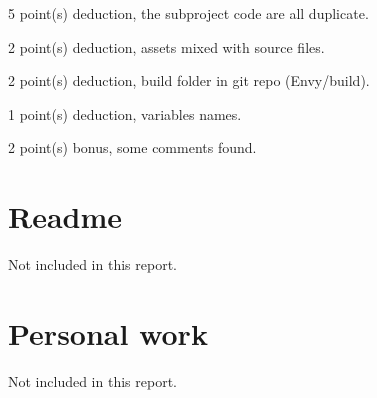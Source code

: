 \documentclass{article}
\begin{document}
5 point(s) {\color{red}deduction}, the subproject code are all duplicate.\medskip

2 point(s) {\color{red}deduction}, assets mixed with source files.\medskip

2 point(s) {\color{red}deduction}, build folder in git repo (Envy/build).\medskip

1 point(s) {\color{red}deduction}, variables names.\medskip

2 point(s) {\color{red}bonus}, some comments found.\medskip



\newpage

\section{Readme}

Not included in this report.

\section{Personal work}

Not included in this report.


\newpage
\end{document}
